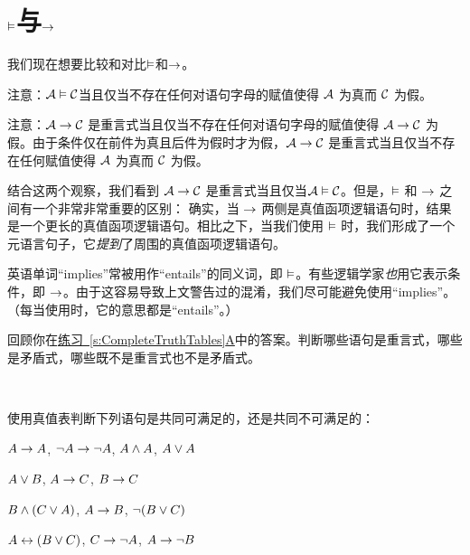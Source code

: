 \section{$\vDash$与$\rightarrow$}\label{entails-v-iff}
我们现在想要比较和对比$\vDash$和$\rightarrow$。

注意：$\mathcal{A} \vDash \mathcal{C}$当且仅当不存在任何对语句字母的赋值使得 $\mathcal{A}$ 为真而 $\mathcal{C}$ 为假。

注意：$\mathcal{A} \rightarrow \mathcal{C}$ 是重言式当且仅当不存在任何对语句字母的赋值使得 $\mathcal{A} \rightarrow \mathcal{C}$ 为假。由于条件仅在前件为真且后件为假时才为假，$\mathcal{A} \rightarrow \mathcal{C}$ 是重言式当且仅当不存在任何赋值使得 $\mathcal{A}$ 为真而 $\mathcal{C}$ 为假。

结合这两个观察，我们看到 $\mathcal{A} \rightarrow \mathcal{C}$ 是重言式当且仅当$\mathcal{A} \vDash \mathcal{C}$。但是，$\vDash$ 和 $\rightarrow$ 之间有一个非常非常重要的区别：
确实，当 $\rightarrow$ 两侧是真值函项逻辑语句时，结果是一个更长的真值函项逻辑语句。相比之下，当我们使用 $\vDash$ 时，我们形成了一个元语言句子，它\emph{提到}了周围的真值函项逻辑语句。

英语单词“implies”常被用作“entails”的同义词，即 $\vDash$。有些逻辑学家\emph{也}用它表示条件，即 $\rightarrow$。由于这容易导致上文警告过的混淆，我们尽可能避免使用“implies”。（每当使用时，它的意思都是“entails”。）

\practiceproblems
\problempart
回顾你在\hyperref[pr.TT.TTorC]{练习~\ref*{s:CompleteTruthTables}A}中的答案。判断哪些语句是重言式，哪些是矛盾式，哪些既不是重言式也不是矛盾式。
\solutions

\

\problempart
\label{pr.TT.satisfiable}
使用真值表判断下列语句是共同可满足的，还是共同不可满足的：


\begin{compactlist}
\item $A\rightarrow A$, $\neg A \rightarrow \neg A$, $A\wedge A$, $A\vee A$ %
\item $A\vee B$, $A\rightarrow C$, $B\rightarrow C$ %
\item $B\wedge(C\vee A)$, $A\rightarrow B$, $\neg(B\vee C)$  %
\item $A\leftrightarrow(B\vee C)$, $C\rightarrow \neg A$, $A\rightarrow \neg B$ %
\end{compactlist}

